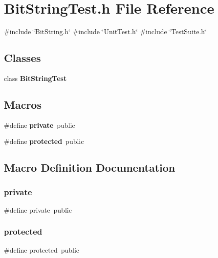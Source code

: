 \section{Bit\+String\+Test.\+h File Reference}
\label{BitStringTest_8h}
{\ttfamily \#include \char`\"{}Bit\+String.\+h\char`\"{}}\newline
{\ttfamily \#include \char`\"{}Unit\+Test.\+h\char`\"{}}\newline
{\ttfamily \#include \char`\"{}Test\+Suite.\+h\char`\"{}}\newline
\subsection*{Classes}
\begin{DoxyCompactItemize}
\item 
class \textbf{ Bit\+String\+Test}
\end{DoxyCompactItemize}
\subsection*{Macros}
\begin{DoxyCompactItemize}
\item 
\#define \textbf{ private}~public
\item 
\#define \textbf{ protected}~public
\end{DoxyCompactItemize}


\subsection{Macro Definition Documentation}
\mbox{\label{BitStringTest_8h_a6a1d6e1a12975a4e9a0b5b952e79eaad}} 
\subsubsection{private}
{\footnotesize\ttfamily \#define private~public}

\mbox{\label{BitStringTest_8h_a363c8dcebb1777654ad1703136a14ec8}} 
\subsubsection{protected}
{\footnotesize\ttfamily \#define protected~public}

